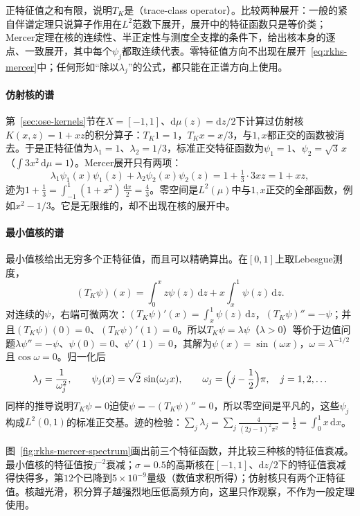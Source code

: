 正特征值之和有限，说明$T_K$是（trace-class operator）。比较两种展开：一般的紧自伴谱定理只说算子作用在$L^2$范数下展开，展开中的特征函数只是等价类；Mercer定理在核的连续性、半正定性与测度全支撑的条件下，给出核本身的逐点、一致展开，其中每个$\psi_j$都取连续代表。零特征值方向不出现在展开~\eqref{eq:rkhs-mercer}中；任何形如“除以$\lambda_j$”的公式，都只能在正谱方向上使用。

\paragraph{仿射核的谱}

第~\ref{sec:ose-kernels}节在$X=[-1,1]$、$\mathrm d\mu(z)=\mathrm dz/2$下计算过仿射核$K(x,z)=1+xz$的积分算子：$T_K1=1$，$T_Kx=x/3$，与$1,x$都正交的函数被消去。于是正特征值为$\lambda_1=1$、$\lambda_2=1/3$，标准正交特征函数为$\psi_1=1$、$\psi_2=\sqrt3\,x$（$\int3x^2\,\mathrm d\mu=1$）。Mercer展开只有两项：
\[
\lambda_1\psi_1(x)\psi_1(z)+\lambda_2\psi_2(x)\psi_2(z)=1+\tfrac13\cdot3xz=1+xz ,
\]
迹为$1+\tfrac13=\int_{-1}^1(1+x^2)\,\tfrac{\mathrm dx}2=\tfrac43$。零空间是$L^2(\mu)$中与$1,x$正交的全部函数，例如$x^2-1/3$。它是无限维的，却不出现在核的展开中。

\paragraph{最小值核的谱}

最小值核给出无穷多个正特征值，而且可以精确算出。在$[0,1]$上取Lebesgue测度，
\[
(T_K\psi)(x)=\int_0^xz\psi(z)\,\mathrm dz+x\int_x^1\psi(z)\,\mathrm dz .
\]
对连续的$\psi$，右端可微两次：$(T_K\psi)'(x)=\int_x^1\psi(z)\,\mathrm dz$，$(T_K\psi)''=-\psi$；并且$(T_K\psi)(0)=0$、$(T_K\psi)'(1)=0$。所以$T_K\psi=\lambda\psi$（$\lambda>0$）等价于边值问题$\lambda\psi''=-\psi$、$\psi(0)=0$、$\psi'(1)=0$，其解为$\psi(x)=\sin(\omega x)$，$\omega=\lambda^{-1/2}$且$\cos\omega=0$。归一化后
\[
\lambda_j=\frac1{\omega_j^2},\qquad \psi_j(x)=\sqrt2\,\sin(\omega_jx),\qquad \omega_j=\Bigl(j-\frac12\Bigr)\pi,\quad j=1,2,\ldots
\]
同样的推导说明$T_K\psi=0$迫使$\psi=-(T_K\psi)''=0$，所以零空间是平凡的，这些$\psi_j$构成$L^2(0,1)$的标准正交基。迹的检验：$\sum_j\lambda_j=\sum_j\frac{4}{(2j-1)^2\pi^2}=\frac12=\int_0^1x\,\mathrm dx$。

图~\ref{fig:rkhs-mercer-spectrum}画出前三个特征函数，并比较三种核的特征值衰减。最小值核的特征值按$j^{-2}$衰减；$\sigma=0.5$的高斯核在$[-1,1]$、$\mathrm dz/2$下的特征值衰减得快得多，第$12$个已降到$5\times10^{-9}$量级（数值求积所得）；仿射核只有两个正特征值。核越光滑，积分算子越强烈地压低高频方向，这里只作观察，不作为一般定理使用。

